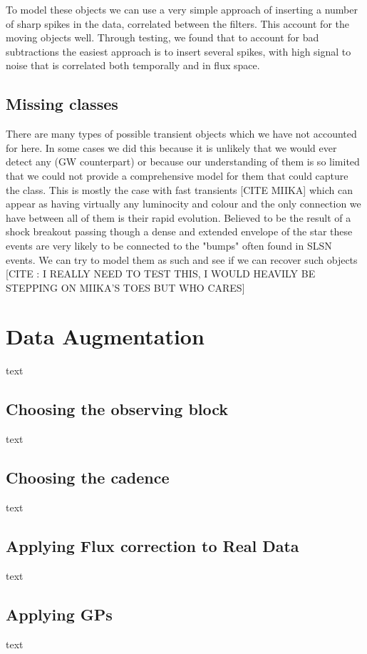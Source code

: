 To model these objects we can use a very simple approach of inserting a number of sharp spikes in the data, correlated between the filters. This account for the moving objects well. Through testing, we found that to account for bad subtractions the easiest approach is to insert several spikes, with high signal to noise that is correlated both temporally and in flux space.

\subsection{Missing classes}
There are many types of possible transient objects which we have not accounted for here. In some cases we did this because it is unlikely that we would ever detect any (GW counterpart) or because our understanding of them is so limited that we could not provide a comprehensive model for them that could capture the class. This is mostly the case with fast transients [CITE MIIKA] which can appear as having virtually any luminocity and colour and the only connection we have between all of them is their rapid evolution. Believed to be the result of a shock breakout passing though a dense and extended envelope of the star these events are very likely to be connected to the "bumps" often found in SLSN events. We can try to model them as such and see if we can recover such objects [CITE : I REALLY NEED TO TEST THIS, I WOULD HEAVILY BE STEPPING ON MIIKA'S TOES BUT WHO CARES]

\section{Data Augmentation} \label{sec:DataAugmentation}
text
\subsection{Choosing the observing block}
text
\subsection{Choosing the cadence}
text
\subsection{Applying Flux correction to Real Data}
text
\subsection{Applying GPs}
text


